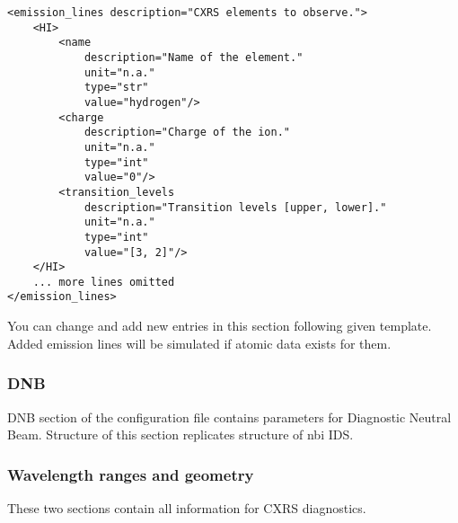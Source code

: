 \documentclass[../main.tex]{subfiles}
\begin{document}
\begin{verbatim}
<emission_lines description="CXRS elements to observe.">
    <HI>
        <name
            description="Name of the element."
            unit="n.a."
            type="str"
            value="hydrogen"/>
        <charge
            description="Charge of the ion."
            unit="n.a."
            type="int"
            value="0"/>
        <transition_levels
            description="Transition levels [upper, lower]."
            unit="n.a."
            type="int"
            value="[3, 2]"/>
    </HI>
    ... more lines omitted
</emission_lines>
\end{verbatim}


You can change and add new entries in this section following given template. Added emission lines will be simulated if atomic data exists for them.

\subsubsection{DNB}

DNB section of the configuration file contains parameters for Diagnostic Neutral Beam. Structure of this section replicates structure of nbi IDS.

\subsubsection{Wavelength ranges and geometry}

These two sections contain all information for CXRS diagnostics.
\end{document}
